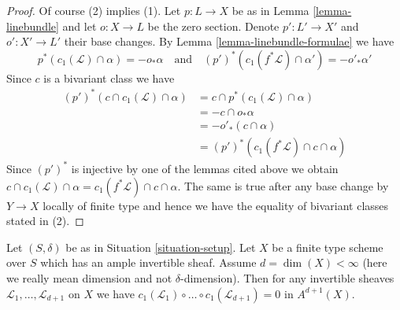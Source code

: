 \begin{proof}
Of course (2) implies (1).
Let $p : L \to X$ be as in Lemma \ref{lemma-linebundle} and let $o : X \to L$
be the zero section. Denote $p' : L' \to X'$ and $o' : X' \to L'$
their base changes. By Lemma \ref{lemma-linebundle-formulae} we have
$$
p^*(c_1(\mathcal{L}) \cap \alpha) = - o_* \alpha
\quad\text{and}\quad
(p')^*(c_1(f^*\mathcal{L}) \cap \alpha') = - o'_* \alpha'
$$
Since $c$ is a bivariant class we have
\begin{align*}
(p')^*(c \cap c_1(\mathcal{L}) \cap \alpha)
& =
c \cap p^*(c_1(\mathcal{L}) \cap \alpha) \\
& =
- c \cap o_* \alpha \\
& =
- o'_*(c \cap \alpha) \\
& =
(p')^*(c_1(f^*\mathcal{L}) \cap c \cap \alpha)
\end{align*}
Since $(p')^*$ is injective by one of the lemmas cited above we obtain
$c \cap c_1(\mathcal{L}) \cap \alpha =
c_1(f^*\mathcal{L}) \cap c \cap \alpha$.
The same is true after any base change by $Y \to X$ locally of finite type
and hence we have the equality of bivariant classes stated in (2).
\end{proof}

\begin{lemma}
\label{lemma-vanish-above-dimension}
Let $(S, \delta)$ be as in Situation \ref{situation-setup}. Let $X$ be a
finite type scheme over $S$ which has an ample invertible sheaf.
Assume $d = \dim(X) < \infty$ (here we really mean dimension and
not $\delta$-dimension).
Then for any invertible sheaves $\mathcal{L}_1, \ldots, \mathcal{L}_{d + 1}$
on $X$ we have
$c_1(\mathcal{L}_1) \circ \ldots \circ c_1(\mathcal{L}_{d + 1}) = 0$
in $A^{d + 1}(X)$.
\end{lemma}

